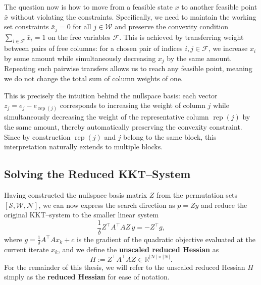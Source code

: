 \documentclass{book}
\theoremstyle{definition}
\numberwithin{algorithm_}{chapter}
\begin{document}
{\medskip

The question now is how to move from a feasible state $x$ 
to another feasible point \(\bar{x}\) without violating the constraints. Specifically, we need to maintain the working set constraints \(\bar{x}_j = 0\) for all \(j \in \mathcal{W}\) and preserve the convexity condition \(\sum_{i \in \mathcal{F}} \bar{x}_i = 1\) on the free variables \(\mathcal{F}\).  
This is achieved by transferring weight between pairs of free columns: for a chosen pair of indices \(i,j \in \mathcal{F}\), we increase \(x_i\) by some amount while simultaneously decreasing \(x_j\) by the same amount. Repeating such pairwise transfers allows us to reach any feasible point, meaning we do not change the total sum of column weights of one.

\medskip

This is precisely the intuition behind the nullspace basis: each vector 
\(z_j = e_j - e_{\operatorname{rep}(j)}\) corresponds to increasing the weight of column \(j\) while simultaneously decreasing the weight of the representative column 
\(\operatorname{rep}(j)\) by the same amount, thereby automatically preserving the convexity constraint.  
Since by construction \(\operatorname{rep}(j)\) and \(j\) belong to the same block, this interpretation naturally extends to multiple blocks.






\subsection{Solving the Reduced KKT--System}

Having constructed the nullspace basis matrix \(Z\) from the permutation sets \([\mathcal{S}, \mathcal{W}, \mathcal{N}]\), we can now express the search direction as \(p = Z y\) and reduce the original KKT--system to the smaller linear system
\begin{equation} \label{eq:reduced-KKT}
\frac{1}{\delta} Z^\top A^\top A Z \, y = - Z^\top g,
\end{equation}
where \(g = \frac{1}{\delta} A^\top A x_k + c\) is the gradient of the quadratic objective evaluated at the current iterate \(x_k\), and we define the \textbf{unscaled reduced Hessian} as
\begin{equation} \label{eq:reduced_Hessian}
H := Z^\top A^\top A Z \in \mathbb{R}^{|\mathcal{N}| \times |\mathcal{N}|}.
\end{equation}
For the remainder of this thesis, we will refer to the unscaled reduced Hessian $H$ simply as the \textbf{reduced Hessian} for ease of notation.

}
\end{document}
